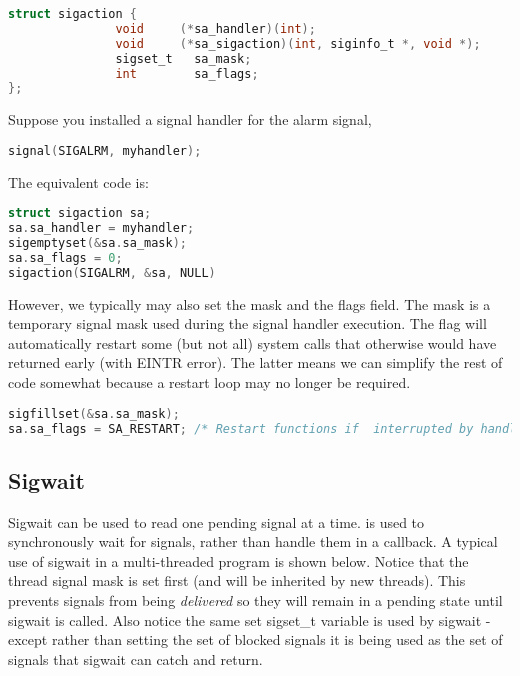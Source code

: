 \begin{lstlisting}[language=C]
struct sigaction {
               void     (*sa_handler)(int);
               void     (*sa_sigaction)(int, siginfo_t *, void *);
               sigset_t   sa_mask;
               int        sa_flags;
};
\end{lstlisting}

Suppose you installed a signal handler for the alarm signal,

\begin{lstlisting}[language=C]
signal(SIGALRM, myhandler);
\end{lstlisting}

The equivalent  code is:

\begin{lstlisting}[language=C]
struct sigaction sa;
sa.sa_handler = myhandler;
sigemptyset(&sa.sa_mask);
sa.sa_flags = 0;
sigaction(SIGALRM, &sa, NULL)
\end{lstlisting}

However, we typically may also set the mask and the flags field. The mask is a temporary signal mask used during the signal handler execution. The  flag will automatically restart some (but not all) system calls that otherwise would have returned early (with EINTR error). The latter means we can simplify the rest of code somewhat because a restart loop may no longer be required.

\begin{lstlisting}[language=C]
sigfillset(&sa.sa_mask);
sa.sa_flags = SA_RESTART; /* Restart functions if  interrupted by handler */
\end{lstlisting}

\subsection{Sigwait}

Sigwait can be used to read one pending signal at a time.  is used to synchronously wait for signals, rather than handle them in a callback. A typical use of sigwait in a multi-threaded program is shown below. Notice that the thread signal mask is set first (and will be inherited by new threads). This prevents signals from being \emph{delivered} so they will remain in a pending state until sigwait is called. Also notice the same set sigset\_t variable is used by sigwait - except rather than setting the set of blocked signals it is being used as the set of signals that sigwait can catch and return.

